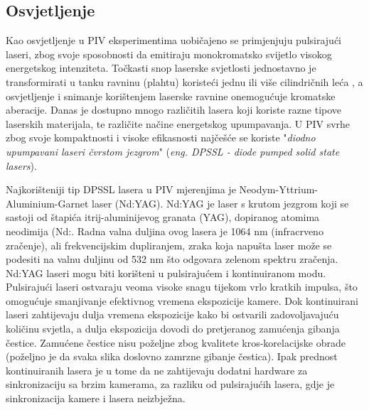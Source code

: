 \subsection{Osvjetljenje}
Kao osvjetljenje u PIV eksperimentima uobičajeno se primjenjuju pulsirajući laseri, zbog svoje sposobnosti da emitiraju monokromatsko svijetlo visokog energetskog intenziteta. Točkasti snop laserske svjetlosti jednostavno je transformirati u tanku ravninu (plahtu) koristeći jednu ili više cilindričnih leća \cite{raffel2018_book}, a osvjetljenje i snimanje korištenjem laserske ravnine onemogućuje kromatske aberacije. Danas je dostupno mnogo različitih lasera koji koriste razne tipove laserskih materijala, te različite načine energetskog upumpavanja. U PIV svrhe zbog svoje kompaktnosti i visoke efikasnosti najčešće se koriste "\textit{diodno upumpavani laseri čvrstom jezgrom}" (\textit{eng. DPSSL - diode pumped solid state lasers}).
\par
Najkorišteniji tip DPSSL lasera u PIV mjerenjima je Neodym-Yttrium-Aluminium-Garnet laser (Nd:YAG). Nd:YAG je laser s krutom jezgrom \cite{wiki:Nd:YAG} koji se sastoji od štapića itrij-aluminijevog granata (YAG), dopiranog atomima neodimija (Nd:. Radna valna duljina ovog lasera je 1064 nm (infracrveno zračenje), ali frekvencijskim dupliranjem, zraka koja napušta laser može se podesiti na valnu duljinu od 532 nm što odgovara zelenom spektru zračenja. Nd:YAG laseri mogu biti korišteni u pulsirajućem i kontinuiranom modu. Pulsirajući laseri ostvaraju veoma visoke snagu tijekom vrlo kratkih impulsa, što omogućuje smanjivanje efektivnog vremena ekspozicije kamere. Dok kontinuirani laseri zahtijevaju dulja vremena ekspozicije kako bi ostvarili zadovoljavajuću količinu svjetla, a dulja ekspozicija dovodi do pretjeranog zamućenja gibanja čestice. Zamućene čestice nisu poželjne zbog kvalitete kros-korelacijske obrade (poželjno je da svaka slika doslovno zamrzne gibanje čestica). Ipak prednost kontinuiranih lasera je u tome da ne zahtijevaju dodatni hardware za sinkronizaciju sa brzim kamerama, za razliku od pulsirajućih lasera, gdje je sinkronizacija kamere i lasera neizbježna.
